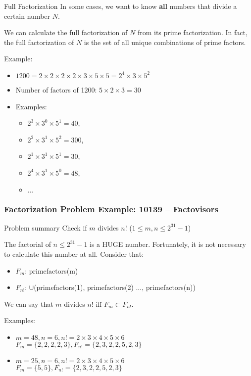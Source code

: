 \begin{frame}{Full Factorization}
  In some cases, we want to know {\bf all} numbers that divide a certain number $N$.\bigskip

  We can calculate the full factorization of $N$ from its prime factorization. In fact, the full factorization of $N$ is the set of all unique combinations of prime factors.\bigskip

  Example:
  \begin{itemize}
    \item $1200 = 2\times2\times2\times2\times3\times5\times5 = 2^4\times3\times5^2$
    \item Number of factors of 1200: $5\times2\times3 = 30$
    \item Examples:
    \begin{itemize}
      \item $2^3 \times 3^0 \times 5^1 = 40$,
      \item $2^2 \times 3^1 \times 5^2 = 300$,
      \item $2^1 \times 3^1 \times 5^1 = 30$,
      \item $2^4 \times 3^1 \times 5^0 = 48$,
      \item $\ldots$
    \end{itemize}
  \end{itemize}
\end{frame}

\begin{frame}
  \frametitle{Factorization Problem Example: 10139 -- Factovisors}

    \begin{block}{Problem summary}
      Check if $m$ divides $n!$ ($1 \leq m,n \leq 2^{31}-1$)
    \end{block}

    The factorial of $n \leq 2^{31}-1$ is a HUGE number. Fortunately, it is not necessary to calculate this number at all. Consider that:

    \begin{itemize}
    \item $F_m$: primefactors(m)
    \item $F_{n!}$: $\cup$(primefactors(1), primefactors(2) $\ldots$, primefactors(n))
    \end{itemize}

    We can say that $m$ divides $n!$ iff $F_m \subset F_{n!}$.\bigskip

    Examples:
    \begin{itemize}
    \item $m = 48, n=6, n! = 2\times3\times4\times5\times6$\\
      $F_m = \{2,2,2,2,3\}, F_{n!} = \{2,3,2,2,5,2,3\}$

  \medskip

    \item $m = 25, n=6, n! = 2\times3\times4\times5\times6$\\
      $F_m = \{5,5\}, F_{n!} = \{2,3,2,2,5,2,3\}$

    \end{itemize}
\end{frame}


